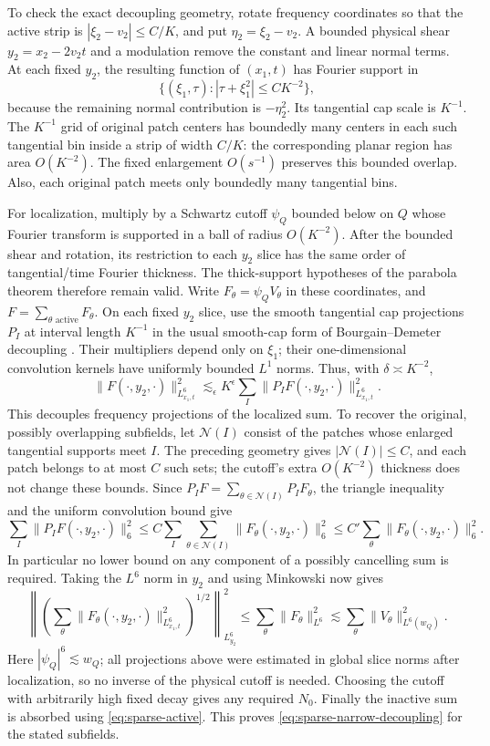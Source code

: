 To check the exact decoupling geometry, rotate frequency coordinates
so that the active strip is $|\xi_2-v_2|\le C/K$, and put
$\eta_2=\xi_2-v_2$.  A bounded physical shear
$y_2=x_2-2v_2t$ and a modulation remove the constant and linear normal
terms.  At each fixed $y_2$, the resulting function of $(x_1,t)$ has
Fourier support in
\[
 \{(\xi_1,\tau): |\tau+\xi_1^2|\le C K^{-2}\},
\]
because the remaining normal contribution is $-\eta_2^2$.
Its tangential cap scale is $K^{-1}$.  The $K^{-1}$ grid of original
patch centers has boundedly many centers in each such tangential bin
inside a strip of width $C/K$: the corresponding planar region has
area $O(K^{-2})$.  The fixed enlargement $O(s^{-1})$ preserves this
bounded overlap.  Also, each original patch meets only boundedly many
tangential bins.

For localization, multiply by a Schwartz cutoff $\psi_Q$ bounded below on $Q$
whose Fourier transform is supported in a ball of radius $O(K^{-2})$.
After the bounded shear and rotation, its restriction to each $y_2$
slice has the same order of tangential/time Fourier thickness.  The
thick-support hypotheses of the parabola theorem therefore remain
valid.  Write $F_\theta=\psi_QV_\theta$ in these coordinates, and
$F=\sum_{\theta\text{ active}}F_\theta$.  On each fixed $y_2$ slice,
use the smooth tangential cap projections $P_I$ at interval length
$K^{-1}$ in the usual smooth-cap form of Bourgain--Demeter decoupling
\cite[Theorem~1.1]{BD15}.  Their multipliers depend only on $\xi_1$;
their one-dimensional convolution kernels have uniformly bounded
$L^1$ norms.  Thus, with $\delta\asymp K^{-2}$,
\[
 \|F(\cdot,y_2,\cdot)\|_{L^6_{x_1,t}}^2
 \lesssim_\epsilon K^\epsilon
       \sum_I\|P_IF(\cdot,y_2,\cdot)\|_{L^6_{x_1,t}}^2.
\]
This decouples frequency projections of the localized sum.  To
recover the original, possibly overlapping subfields, let
$\mathcal N(I)$ consist of the patches whose enlarged tangential
supports meet $I$.  The preceding geometry gives
$|\mathcal N(I)|\le C$, and each patch belongs to at most $C$ such
sets; the cutoff's extra $O(K^{-2})$ thickness does not change these
bounds.  Since $P_IF=\sum_{\theta\in\mathcal N(I)}P_IF_\theta$,
the triangle inequality and the uniform convolution bound give
\[
 \sum_I\|P_IF(\cdot,y_2,\cdot)\|_6^2
 \le C\sum_I\sum_{\theta\in\mathcal N(I)}
                 \|F_\theta(\cdot,y_2,\cdot)\|_6^2
 \le C'\sum_\theta\|F_\theta(\cdot,y_2,\cdot)\|_6^2.
\]
In particular no lower bound on any component of a possibly cancelling
sum is required.  Taking the $L^6$ norm in $y_2$ and using Minkowski
now gives
\[
 \left\|\left(\sum_\theta
       \|F_\theta(\cdot,y_2,\cdot)\|_{L^6_{x_1,t}}^2
             \right)^{1/2}\right\|_{L^6_{y_2}}^2
 \le\sum_\theta\|F_\theta\|_{L^6}^2
 \lesssim\sum_\theta\|V_\theta\|_{L^6(w_Q)}^2.
\]
Here $|\psi_Q|^6\lesssim w_Q$; all projections above were estimated
in global slice norms after localization, so no inverse of the
physical cutoff is needed.  Choosing the cutoff with
arbitrarily high fixed decay gives any required $N_0$.  Finally the
inactive sum is absorbed using \eqref{eq:sparse-active}.  This proves
\eqref{eq:sparse-narrow-decoupling} for the stated subfields.

